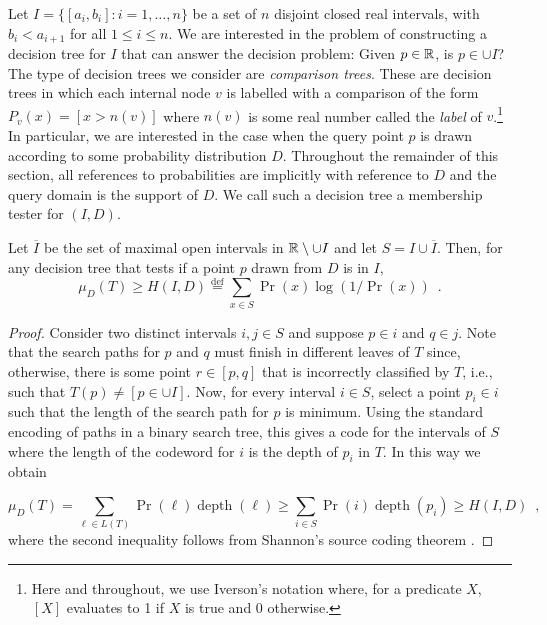 \documentclass[charterfonts,lotsofwhite]{patmorin}
\newcommand{\defequals}{\stackrel{\mathrm{def}}{=}}
\DeclareMathOperator{\depth}{depth}
\begin{document}
Let $I=\{[a_i,b_i]: i=1,\ldots,n\}$ be a set of $n$ disjoint closed
real intervals, with $b_i < a_{i+1}$ for all $1\le i\le n$.  We are
interested in the problem of constructing a decision tree for $I$ that
can answer the decision problem: Given $p\in\mathbb{R}$, is $p\in \cup I$?
The type of decision trees we consider are \emph{comparison trees}.
These are decision trees in which each internal node $v$ is labelled
with a comparison of the form $P_v(x) = [x > n(v)]$ where $n(v)$ is
some real number called the \emph{label} of $v$.\footnote{Here and
throughout, we use Iverson's notation \cite{kXX} where, for a
predicate $X$, $[X]$ evaluates to 1 if $X$ is true and 0 otherwise.}
In particular, we are interested in the case when the query point $p$
is drawn according to some probability distribution $D$.   Throughout
the remainder of this section, all references to probabilities are
implicitly with reference to $D$ and the query domain is the support
of $D$.  We call such a decision tree a membership tester for $(I,D)$.


\begin{lem}
Let $\overline{I}$ be the set of maximal open intervals in
$\mathbb{R}\setminus\cup I$ and let $S=I\cup \overline{I}$.  Then,
for any decision tree that tests if a point $p$ drawn from $D$
is in $I$,
\[
    \mu_D(T) \ge H(I,D) \defequals 
	\sum_{x\in S} \Pr(x)\log(1/\Pr(x)) \enspace .
\]
\end{lem}

\begin{proof}
Consider two distinct intervals $i,j\in S$ and suppose $p\in i$ and
$q\in j$.  Note that the search paths for $p$ and $q$ must finish in
different leaves of $T$ since, otherwise, there is some point
$r\in[p,q]$ that is incorrectly classified by $T$, i.e., such
that $T(p)\neq [p\in\cup I]$.  Now, for every interval $i\in S$,
select a point $p_i\in i$ such that the length of the search path for
$p$ is minimum.   Using the standard encoding of paths in a binary
search tree, this gives a code for the intervals of $S$ where the
length of the codeword for $i$ is the depth of $p_i$ in $T$.  In this
way we obtain

\[
   \mu_D(T)
    = \sum_{\ell\in L(T)} \Pr(\ell)\depth(\ell)
   \ge \sum_{i \in S} \Pr(i)\depth(p_i)
   \ge H(I,D)
   \enspace , 
\]
where the second inequality follows from Shannon's source coding
theorem \cite{X}.
\end{proof}
\end{document}
